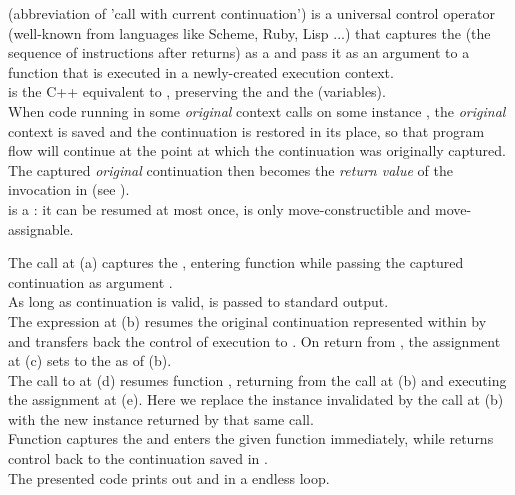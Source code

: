 
\cc (abbreviation of 'call with current continuation') is a universal control
operator (well-known from languages like Scheme, Ruby, Lisp ...) that captures
the \currcont (the sequence of instructions after \cc returns) as a
 and pass it as an argument to a function that is
executed in a newly-created execution context.\\

\call is the C++ equivalent to \cc, preserving the  and the
 (variables).\\

When code running in some \emph{original} context calls \contop on some \cont
instance , the \emph{original} context is saved and
the  continuation is restored in its place, so that program flow
will continue at the point at which the  continuation was
originally captured. The captured \emph{original} continuation then becomes
the \emph{return value} of the \call invocation in 
(see ).\\

\cont is a : it can be resumed at most once, is only
move-constructible and move-assignable.

The  call at (a) captures the \currcont, entering function
 while passing the captured continuation as argument .\\
As long as continuation  is valid,  is passed to standard
output.\\
The expression  at (b) resumes the original
continuation represented within  by  and transfers back the
control of execution to . On return from ,
the assignment at (c) sets  to the \currcont as of (b).\\
The call to  at (d)
resumes function , returning from the \op call at (b) and executing
the assignment at (e). Here we replace the \cont instance 
invalidated by the \op call at (b) with the new instance returned by that
same \op call.\\
Function \call captures the \currcont and enters the given function immediately,
while \op returns control back to the continuation saved in .\\
The presented code prints out  and  in a endless loop.\\

